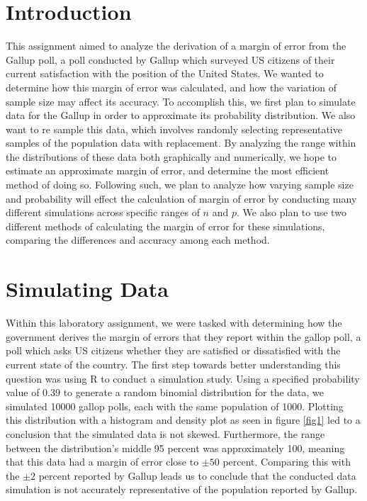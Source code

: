 \documentclass{article}\usepackage[]{graphicx}\usepackage[]{xcolor}
\begin{document}
\begin{multicols}{2}
\section{Introduction}
This assignment aimed to analyze the derivation of a margin of error from the Gallup poll, a poll conducted by Gallup which surveyed US citizens of their current satisfaction with the position of the United States. We wanted to determine how this margin of error was calculated, and how the variation of sample size may affect its accuracy. To accomplish this, we first plan to simulate data for the Gallup in order to approximate its probability distribution. We also want to re sample this data, which involves randomly selecting representative samples of the population data with replacement. By analyzing the range within the distributions of these data both graphically and numerically, we hope to estimate an approximate margin of error, and determine the most efficient method of doing so. Following such, we plan to analyze how varying sample size and probability will effect the calculation of margin of error by conducting many different simulations across specific ranges of $n$ and $p$. We also plan to use two different methods of calculating the margin of error for these simulations, comparing the differences and accuracy among each method.

\section{Simulating Data}
Within this laboratory assignment, we were tasked with determining how the government derives the margin of errors that they report within the gallop poll, a poll which asks US citizens whether they are satisfied or dissatisfied with the current state of the country. The first step towards better understanding this question was using R to conduct a simulation study. Using a specified probability value of 0.39 to generate a random binomial distribution for the data, we simulated 10000 gallop polls, each with the same population of 1000. Plotting this distribution with a histogram and density plot as seen in figure \ref{fig1} led to a conclusion that the simulated data is not skewed. Furthermore, the range between the distribution's middle 95 percent was approximately 100, meaning that this data had a margin of error close to $\pm 50$ percent. Comparing this with the $\pm 2$ percent reported by Gallup leads us to conclude that the conducted data simulation is not accurately representative of the population reported by Gallup.


\end{multicols}
\end{document}
